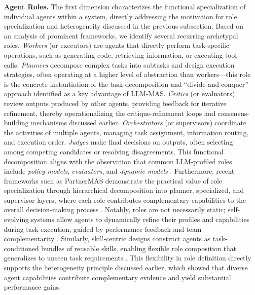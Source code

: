 \documentclass[11pt]{article}
\begin{document}
\textbf{Agent Roles.} The first dimension characterizes the functional specialization of individual agents within a system, directly addressing the motivation for role specialization and heterogeneity discussed in the previous subsection. Based on an analysis of prominent frameworks, we identify several recurring archetypal roles. \emph{Workers} (or executors) are agents that directly perform task-specific operations, such as generating code, retrieving information, or executing tool calls. \emph{Planners} decompose complex tasks into subtasks and design execution strategies, often operating at a higher level of abstraction than workers---this role is the concrete instantiation of the task decomposition and ``divide-and-conquer'' approach identified as a key advantage of LLM-MAS. \emph{Critics} (or evaluators) review outputs produced by other agents, providing feedback for iterative refinement, thereby operationalizing the critique-refinement loops and consensus-building mechanisms discussed earlier. \emph{Orchestrators} (or supervisors) coordinate the activities of multiple agents, managing task assignment, information routing, and execution order. \emph{Judges} make final decisions on outputs, often selecting among competing candidates or resolving disagreements. This functional decomposition aligns with the observation that common LLM-profiled roles include \emph{policy models}, \emph{evaluators}, and \emph{dynamic models} \cite{ref41}. Furthermore, recent frameworks such as PartnerMAS demonstrate the practical value of role specialization through hierarchical decomposition into planner, specialized, and supervisor layers, where each role contributes complementary capabilities to the overall decision-making process \cite{ref42}. Notably, roles are not necessarily static; self-evolving systems allow agents to dynamically refine their profiles and capabilities during task execution, guided by performance feedback and team complementarity \cite{ref43}. Similarly, skill-centric designs construct agents as task-conditioned bundles of reusable skills, enabling flexible role composition that generalizes to unseen task requirements \cite{ref44}. This flexibility in role definition directly supports the heterogeneity principle discussed earlier, which showed that diverse agent capabilities contribute complementary evidence and yield substantial performance gains.
\end{document}
